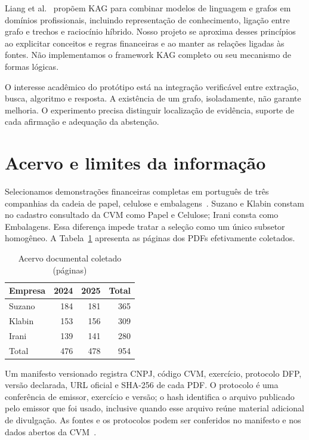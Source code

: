 \documentclass[conference]{IEEEtran}
\begin{document}
Liang et al.~\cite{kag} propõem KAG para combinar modelos de linguagem e grafos em domínios profissionais, incluindo representação de conhecimento, ligação entre grafo e trechos e raciocínio híbrido. Nosso projeto se aproxima desses princípios ao explicitar conceitos e regras financeiras e ao manter as relações ligadas às fontes. Não implementamos o framework KAG completo ou seu mecanismo de formas lógicas.

O interesse acadêmico do protótipo está na integração verificável entre extração, busca, algoritmo e resposta. A existência de um grafo, isoladamente, não garante melhoria. O experimento precisa distinguir localização de evidência, suporte de cada afirmação e adequação da abstenção.

\section{Acervo e limites da informação}

Selecionamos demonstrações financeiras completas em português de três companhias da cadeia de papel, celulose e embalagens~\cite{suzano,klabin,irani}. Suzano e Klabin constam no cadastro consultado da CVM como Papel e Celulose; Irani consta como Embalagens. Essa diferença impede tratar a seleção como um único subsetor homogêneo. A Tabela~\ref{tab:acervo} apresenta as páginas dos PDFs efetivamente coletados.

\begin{table}[htbp]
\caption{Acervo documental coletado (páginas)}
\label{tab:acervo}
\centering
\begin{tabular}{lrrr}
\toprule
Empresa & 2024 & 2025 & Total \\
\midrule
Suzano & 184 & 181 & 365 \\
Klabin & 153 & 156 & 309 \\
Irani  & 139 & 141 & 280 \\
\midrule
Total  & 476 & 478 & 954 \\
\bottomrule
\end{tabular}
\end{table}

Um manifesto versionado registra CNPJ, código CVM, exercício, protocolo DFP, versão declarada, URL oficial e SHA-256 de cada PDF. O protocolo é uma conferência de emissor, exercício e versão; o hash identifica o arquivo publicado pelo emissor que foi usado, inclusive quando esse arquivo reúne material adicional de divulgação. As fontes e os protocolos podem ser conferidos no manifesto e nos dados abertos da CVM~\cite{cvm}.
\end{document}

